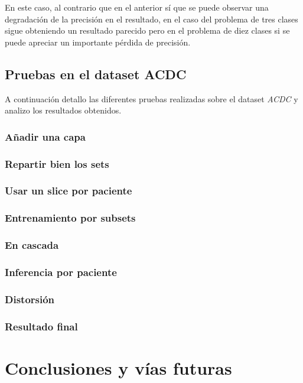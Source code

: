 \documentclass[12pt,a4paper]{article}
\begin{document}
En este caso, al contrario que en el anterior sí que se puede observar una degradación de la precisión en el resultado, en el caso del problema de tres clases sigue obteniendo un resultado parecido pero en el problema de diez clases si se puede apreciar un importante pérdida de precisión.

\subsection{Pruebas en el dataset ACDC}
A continuación detallo las diferentes pruebas realizadas sobre el dataset \textit{ACDC} y analizo los resultados obtenidos.

\subsubsection{Añadir una capa}

\subsubsection{Repartir bien los sets}

\subsubsection{Usar un slice por paciente}

\subsubsection{Entrenamiento por subsets}

\subsubsection{En cascada}

\subsubsection{Inferencia por paciente}

\subsubsection{Distorsión}

\subsubsection{Resultado final}

\newpage
\section{Conclusiones y vías futuras}
\end{document}
